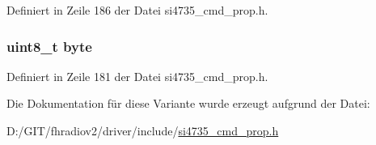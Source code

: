 Definiert in Zeile 186 der Datei si4735\+\_\+cmd\+\_\+prop.\+h.

\hypertarget{unionfm__rds__status__resp12_a96f44d20f1dbf1c8785a7bc99a46164c}{}
\subsubsection[{byte}]{\setlength{\rightskip}{0pt plus 5cm}uint8\+\_\+t byte}\label{unionfm__rds__status__resp12_a96f44d20f1dbf1c8785a7bc99a46164c}


Definiert in Zeile 181 der Datei si4735\+\_\+cmd\+\_\+prop.\+h.



Die Dokumentation für diese Variante wurde erzeugt aufgrund der Datei\+:\begin{DoxyCompactItemize}
\item 
D\+:/\+G\+I\+T/fhradiov2/driver/include/\hyperlink{si4735__cmd__prop_8h}{si4735\+\_\+cmd\+\_\+prop.\+h}\end{DoxyCompactItemize}
